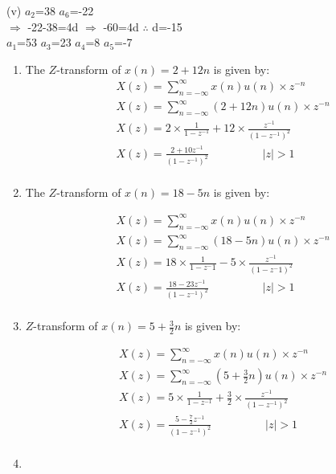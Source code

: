 \documentclass[journal,12pt,twocolumn]{IEEEtran}
\theoremstyle{remark}
\begin{document}
     (v)  $a_2$=38 $a_6$=-22 \\
          $\Longrightarrow$ -22-38=4d $\Longrightarrow$ -60=4d \hspace{2cm}  $\therefore$ d=-15\\
          $a_1$=53 $a_3$=23 $a_4$=8 $a_5$=-7\\


\begin{enumerate}
 \item 
The $Z$-transform of $x(n) = 2 + 12n$ is given by:
\begin{align}
    &X(z)= \sum_{n=-\infty}^{\infty} x(n) u(n) \times z^{-n}\\
    &X(z) = \sum_{n=-\infty}^{\infty} (2+12n) u(n) \times z^{-n}\\
    &X(z)=2 \times \frac{1}{1-{z^{-1}}}+ 12 \times \frac{z^{-1}}{(1-{z^{-1}})^2}\\
    &X(z)=\frac{2+{10z^{-1}}}{(1-{z^{-1}})^2}  \hspace{2cm}  |z|>1 \\
\end{align}
\item
The $Z$-transform of $x(n) = 18 - 5n$ is given by:

\begin{align}
    &X(z) = \sum_{n=-\infty}^{\infty} x(n) u(n)\times z^{-n}\\
    &X(z) = \sum_{n=-\infty}^{\infty} (18-5n) u(n) \times z^{-n}\\
    &X(z)=18 \times \frac{1}{1-{z^-1}} - 5 \times \frac{z^{-1}}{(1-{z^-1})^2}\\
    &X(z)=\frac{18-{23z^{-1}}}{(1-{z^{-1}})^2}  \hspace{2cm}  |z|>1 \\
\end{align}
\item 
$Z$-transform of $x(n) = 5 + \frac{3}{2}n$ is given by:

\begin{align}
    &X(z) = \sum_{n=-\infty}^{\infty} x(n) u(n)\times z^{-n} \\
    &X(z) = \sum_{n=-\infty}^{\infty} (5+\frac{3}{2}n) u(n) \times z^{-n} \\
    &X(z)=5 \times \frac{1}{1-{z^{-1}}}+ \frac{3}{2}\times \frac{z^{-1}}{(1-{z^{-1}})^2}\\
    &X(z)=\frac{5-\frac{7}{2}{z^{-1}}}{(1-{z^{-1}})^2} \hspace{2cm}  |z|>1\\
\end{align}
\item 


\end{enumerate}
\end{document}
